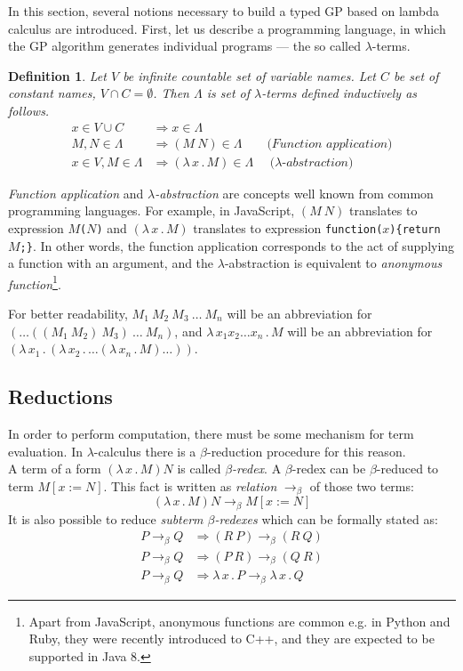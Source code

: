 \documentclass{sig-alternate}
\newtheorem{definition}{Definition}
\newcommand{\lets}{let us\xspace}
\newcommand{\lterms}{$\lambda$-terms\xspace}
\newcommand{\then}{\Rightarrow\xspace}
\newcommand{\lamb}[2]{( \lambda \, #1 \, . \, #2 )}
\newcommand{\lam}[2]{\lambda \, #1 \, . \, #2}
\newcommand{\bRedex}{$\beta$-redex\xspace}
\newcommand{\bRedexes}{$\beta$-redexes\xspace}
\newcommand{\bArrow}{\rightarrow_\beta\xspace}
\begin{document}
In this section, several notions necessary to build a typed GP based on lambda calculus are introduced. 
First, \lets describe a programming language, 
in which the GP algorithm generates individual programs --- the so called \lterms.

\begin{definition}
Let $V$ be infinite countable set of {\it 
variable names}. Let $C$ be set of {\it constant names}, 
$V \cap C = \emptyset$.	 	
Then $\Lambda$ is set of {\it \lterms} defined inductively as follows.	
\begin{align*}
x   \in V \cup C  &\then x     \in \Lambda \\
M,N \in \Lambda   &\then (M~N) \in \Lambda 
\textit{~~~~~~(Function application)} \\
x   \in V , M \in \Lambda &\then \lamb{x}{M} \in \Lambda
\textit{~~~~($\lambda$-abstraction)} 
\end{align*}
\end{definition}


\textit{Function application} and 
\textit{$\lambda$-abstraction} are concepts
well known from common programming languages. 
For example, in JavaScript, 
$(M~N)$ translates to expression \texttt{$M$($N$)} and
$\lamb{x}{M}$ translates to expression \texttt{function($x$)\{return $M$;\}}.
In other words, the function application 
corresponds to the act of supplying a function 
with an argument, and
the $\lambda$-abstraction is equivalent to 
\textit{anonymous function}\footnote{Apart from JavaScript, anonymous functions are common e.g. in Python and Ruby, 
they were recently introduced to C++, and they are expected to be supported in Java 8.}.

For better readability, 
$M_1~M_2~M_3~\dots~M_n$ will be an abbreviation for
$(\dots((M_1~M_2)~M_3)~\dots~M_n)$,
and $\lam{x_1 x_2 \dots x_n }{M}$ will be an abbreviation for 
$\lamb{x_1}{\lamb{x_2}{\dots\lamb{x_n}{M}\dots}}$.


\subsection{Reductions}

In order to perform computation, there must be some
mechanism for term evaluation. In $\lambda$-calculus there
is a \mbox{$\beta$-reduction} procedure for this reason.\\

A term of a form $\lamb{x}{M}N$ is called \textit{\bRedex}.
A \bRedex can be $\beta$-reduced to term $M[x:=N]$. 
This fact is written as \textit{relation} $\bArrow$ 
of those two terms:
\begin{equation} \label{eq:bRed}
\lamb{x}{M}N \bArrow M[x:=N]
\end{equation}
It is also possible to reduce \textit{subterm \bRedexes} 
which can be formally stated as:
\begin{align*}
P \bArrow Q &\then (R~P)      \bArrow (R~Q) \\
P \bArrow Q &\then (P~R)      \bArrow (Q~R) \\
P \bArrow Q &\then \lam{x}{P} \bArrow \lam{x}{Q}  
\end{align*}
\end{document}
